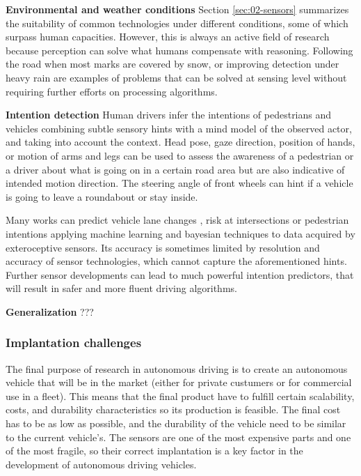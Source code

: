 \textbf{Environmental and weather conditions}    
    Section \ref{sec:02-sensors} summarizes the suitability of common 
    technologies under different conditions, some of which surpass human 
    capacities. 
    However, this is always an active field of research because perception 
    can solve what humans compensate with reasoning. Following the road 
    when most marks are covered by snow, or improving detection under heavy 
    rain are examples of problems that can be solved at sensing level
    without requiring further efforts on processing algorithms.
        
\textbf{Intention detection}        
    Human drivers infer the intentions of pedestrians and vehicles 
    combining subtle sensory hints with a mind model of the observed actor,
    and taking into account the context.
    Head pose, gaze direction, position of hands, or motion of arms and 
    legs can be used to assess the awareness of a pedestrian or a driver
    about what is going on in a certain road area but are also indicative 
    of intended motion direction. The steering angle of front wheels can
    hint if a vehicle is going to leave a roundabout or stay inside.
            
    Many works can predict vehicle lane changes \cite{Kim2017}, risk at
    intersections \cite{Lefevre2012} or pedestrian intentions
    \cite{Kohler2015,Fang2017} applying machine learning and bayesian
    techniques to data acquired by exteroceptive sensors. Its accuracy 
    is sometimes limited by resolution and accuracy of sensor technologies,
    which cannot capture the aforementioned hints.
    Further sensor developments can lead to much powerful intention 
    predictors, that will result in safer and more fluent driving 
    algorithms.
    
\textbf{Generalization} ???
    


\subsubsection{Implantation challenges}

The final purpose of research in autonomous driving is to create an autonomous vehicle that will be in the market (either for private custumers or for commercial use in a fleet). This means that the final product have to fulfill certain scalability, costs, and durability characteristics so its production is feasible. The final cost has to be as low as possible, and the durability of the vehicle need to be similar to the current vehicle's. The sensors are one of the most expensive parts and one of the most fragile, so their correct implantation is a key factor in the development of autonomous driving vehicles.

